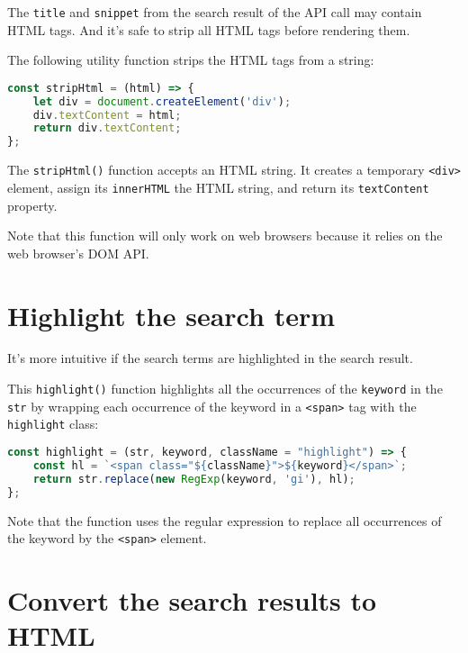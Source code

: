 \documentclass[11pt]{article}
\newenvironment{displayquote} %
{\begin{shaded*}\noindent
\quoting[leftmargin=0pt, vskip=0pt]
}
 {\endquoting
 \end{shaded*}
}
\begin{document}
The \verb|title| and \verb|snippet| from the search result of the API call may
contain HTML tags. And it's safe to strip all HTML tags
before rendering them.
\newline

\noindent
The following utility function strips the HTML tags from a string:

\begin{lstlisting}[language=JavaScript]
const stripHtml = (html) => {
    let div = document.createElement('div');
    div.textContent = html;
    return div.textContent;
};
\end{lstlisting}

The \verb|stripHtml()| function accepts an HTML string. It creates a
temporary \verb|<div>| element, assign its \verb|innerHTML| the HTML string,
and return its \verb|textContent| property.

\begin{displayquote}
Note that this function will only work on web browsers because it
relies on the web browser's DOM API.
\end{displayquote}

\section*{Highlight the search term}

It's more intuitive if the search terms are highlighted in the search result.
\newline

\noindent
This \verb|highlight()| function highlights all the occurrences of the
\verb|keyword| in the \verb|str| by wrapping each occurrence of the keyword in
a \verb|<span>| tag with the \verb|highlight| class:

\begin{lstlisting}[language=JavaScript]
const highlight = (str, keyword, className = "highlight") => {
    const hl = `<span class="${className}">${keyword}</span>`;
    return str.replace(new RegExp(keyword, 'gi'), hl);
};
\end{lstlisting}

\noindent
Note that the function uses the regular expression to replace all
occurrences of the keyword by the \verb|<span>| element.

\section*{Convert the search results to HTML}
\end{document}
